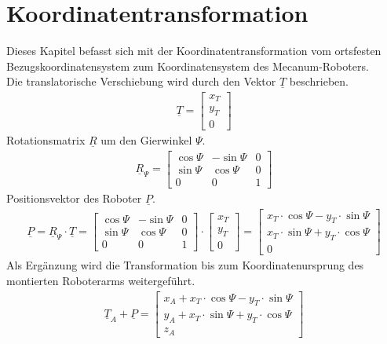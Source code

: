 \documentclass[a4paper]{article}
\begin{document}
\section{Koordinatentransformation}
Dieses Kapitel befasst sich mit der Koordinatentransformation vom ortsfesten Bezugskoordinatensystem zum Koordinatensystem des Mecanum-Roboters. \\
Die translatorische Verschiebung wird durch den Vektor $\underline T$ beschrieben.
\begin{align*}
\underline T =
\begin{bmatrix}
x_{T}\\
y_{T}\\
0
\end{bmatrix}
\end{align*}
Rotationsmatrix $\underline R$ um den Gierwinkel $\Psi$.
\begin{align*}
 \underline R_{\Psi} =
\begin{bmatrix}
  \cos{\Psi} & -\sin{\Psi} & 0\\
  \sin{\Psi} & \cos{\Psi} & 0\\
  0 & 0 & 1
\end{bmatrix}
\end{align*} 
Positionsvektor des Roboter $\underline P$.
\begin{align*}
\underline P = \underline R_{\Psi} \cdot \underline T =
\begin{bmatrix}
  \cos{\Psi} & -\sin{\Psi} & 0\\
  \sin{\Psi} & \cos{\Psi} & 0\\
  0 & 0 & 1
\end{bmatrix}\cdot
\begin{bmatrix}
x_{T}\\
y_{T}\\
0
\end{bmatrix}=
\begin{bmatrix}
x_{T} \cdot \cos{\Psi}-y_{T} \cdot \sin{\Psi}\\
x_{T} \cdot \sin{\Psi}+y_{T}  \cdot \cos{\Psi}\\
0
\end{bmatrix}
\end{align*}
Als Ergänzung wird die Transformation bis zum Koordinatenursprung des montierten Roboterarms weitergeführt.
\begin{align*}
\underline T_{A} + \underline P =
\begin{bmatrix}
x_{A} + x_{T} \cdot \cos{\Psi}-y_{T} \cdot \sin{\Psi}\\
y_{A} + x_{T} \cdot \sin{\Psi}+y_{T}  \cdot \cos{\Psi}\\
z_{A}
\end{bmatrix}
\end{align*}
\end{document}
